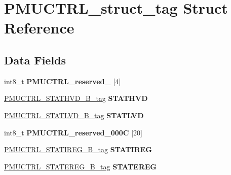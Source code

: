 \hypertarget{structPMUCTRL__struct__tag}{}\section{P\+M\+U\+C\+T\+R\+L\+\_\+struct\+\_\+tag Struct Reference}
\label{structPMUCTRL__struct__tag}
\subsection*{Data Fields}
\begin{DoxyCompactItemize}
\item 
\mbox{\label{structPMUCTRL__struct__tag_a292562fab601895dd5b37122d645efa6}} 
int8\+\_\+t {\bfseries P\+M\+U\+C\+T\+R\+L\+\_\+reserved\+\_} \mbox{[}4\mbox{]}
\item 
\mbox{\label{structPMUCTRL__struct__tag_a3237843c602b689ae5cb2736c53ceea3}} 
\mbox{\hyperlink{unionPMUCTRL__STATHVD__32B__tag}{P\+M\+U\+C\+T\+R\+L\+\_\+\+S\+T\+A\+T\+H\+V\+D\+\_\+B\+\_\+tag}} {\bfseries S\+T\+A\+T\+H\+VD}
\item 
\mbox{\label{structPMUCTRL__struct__tag_ae8ef726c3a8208be977b208f0bcbac12}} 
\mbox{\hyperlink{unionPMUCTRL__STATLVD__32B__tag}{P\+M\+U\+C\+T\+R\+L\+\_\+\+S\+T\+A\+T\+L\+V\+D\+\_\+B\+\_\+tag}} {\bfseries S\+T\+A\+T\+L\+VD}
\item 
\mbox{\label{structPMUCTRL__struct__tag_a72380173ec45bb40491bf8d0d3660ce0}} 
int8\+\_\+t {\bfseries P\+M\+U\+C\+T\+R\+L\+\_\+reserved\+\_\+000C} \mbox{[}20\mbox{]}
\item 
\mbox{\label{structPMUCTRL__struct__tag_a4ec09f3861f05364ec7af5290a6c7242}} 
\mbox{\hyperlink{unionPMUCTRL__STATIREG__32B__tag}{P\+M\+U\+C\+T\+R\+L\+\_\+\+S\+T\+A\+T\+I\+R\+E\+G\+\_\+B\+\_\+tag}} {\bfseries S\+T\+A\+T\+I\+R\+EG}
\item 
\mbox{\label{structPMUCTRL__struct__tag_a02a07108049cd4ab8713477e01005fbf}} 
\mbox{\hyperlink{unionPMUCTRL__STATEREG__32B__tag}{P\+M\+U\+C\+T\+R\+L\+\_\+\+S\+T\+A\+T\+E\+R\+E\+G\+\_\+B\+\_\+tag}} {\bfseries S\+T\+A\+T\+E\+R\+EG}
\item 

\end{DoxyCompactItemize}
